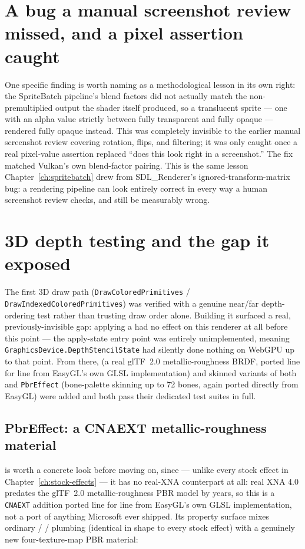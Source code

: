 \section{A bug a manual screenshot review missed, and a pixel assertion caught}

One specific finding is worth naming as a methodological lesson in its own right: the
SpriteBatch pipeline's blend factors did not actually match the non-premultiplied output the
shader itself produced, so a translucent sprite --- one with an alpha value strictly between
fully transparent and fully opaque --- rendered fully opaque instead. This was completely
invisible to the earlier manual screenshot review covering rotation, flips, and filtering; it
was only caught once a real pixel-value assertion replaced ``does this look right in a
screenshot.'' The fix matched Vulkan's own blend-factor pairing. This is the same lesson
Chapter~\ref{ch:spritebatch} drew from SDL\_Renderer's ignored-transform-matrix bug: a
rendering pipeline can look entirely correct in every way a human screenshot review checks,
and still be measurably wrong.

\section{3D depth testing and the gap it exposed}

The first 3D draw path (\texttt{DrawColoredPrimitives} / \texttt{DrawIndexedColoredPrimitives})
was verified with a genuine near/far depth-ordering test rather than trusting draw order
alone. Building it surfaced a real, previously-invisible gap: applying a
 had no effect on this renderer at all before this point --- the
apply-state entry point was entirely unimplemented, meaning
\texttt{GraphicsDevice.DepthStencilState} had silently done nothing on WebGPU up to that
point. From there,  (a real glTF~2.0 metallic-roughness BRDF, ported line
for line from EasyGL's own GLSL implementation) and skinned variants of both
 and \texttt{PbrEffect} (bone-palette skinning up to 72 bones, again
ported directly from EasyGL) were added and both pass their dedicated test suites in full.

\subsection{PbrEffect: a CNAEXT metallic-roughness material}

 is worth a concrete look before moving on, since --- unlike every stock
effect in Chapter~\ref{ch:stock-effects} --- it has no real-XNA counterpart at all: real XNA
4.0 predates the glTF~2.0 metallic-roughness PBR model by years, so this is a \texttt{CNAEXT}
addition ported line for line from EasyGL's own GLSL implementation, not a port of anything
Microsoft ever shipped. Its property surface mixes ordinary /%
 /  plumbing (identical in shape to every stock
effect) with a genuinely new four-texture-map PBR material:

